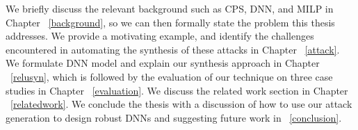 	
We briefly discuss the relevant background such as \ac{CPS}, \ac{DNN}, and \ac{MILP} in Chapter ~\ref{background}, so we can then formally state the problem this thesis addresses. 
We provide a motivating example, and identify the challenges encountered in automating the synthesis of these attacks in Chapter ~\ref{attack}.
We formulate \ac{DNN} model and explain our synthesis approach in Chapter ~\ref{relusyn}, which is followed by the evaluation of our technique on three case studies in Chapter ~\ref{evaluation}.
We discuss the related work section in Chapter ~\ref{relatedwork}.
We conclude the thesis with a discussion of how to use our attack generation to design robust \ac{DNN}s and suggesting future work in ~\ref{conclusion}.










